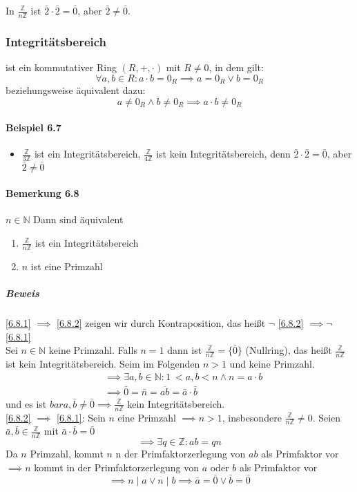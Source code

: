 \documentclass[a4paper]{scrartcl}
\DeclareMathOperator{\Forall}{\forall}
\theoremstyle{definition}
\theoremstyle{plain}
\theoremstyle{plain}
\theoremstyle{remark}
\theoremstyle{remark}
\theoremstyle{remark}
\theoremstyle{remark}
\theoremstyle{remark}
\begin{document}
In $\frac{\mathbb{Z}}{n\mathbb{Z}}$ ist $\bar 2 \cdot \bar 2 = \bar 0$, aber $\bar 2\neq \bar 0$.
\subsubsection{Integritätsbereich}
\label{sec-3-2-5}
\label{Definition-6.6}
ist ein kommutativer Ring $(R,+,\cdot)$ mit $R\neq 0$, in dem gilt:
\[\Forall a,b\in R: a\cdot b = 0_R \implies a = 0_R\vee b = 0_R\]
beziehungsweise äquivalent dazu:
\[a\neq 0_R \wedge b\neq 0_R \implies a\cdot b \neq 0_R\]
\paragraph{Beispiel 6.7}
\label{sec-3-2-5-1}
\begin{itemize}
\item $\frac{\mathbb{Z}}{3\mathbb{Z}}$ ist ein Integritätsbereich, $\frac{\mathbb{Z}}{4\mathbb{Z}}$ ist kein Integritätsbereich, denn $\bar 2\cdot \bar 2 = \bar 0$, aber $\bar 2 \neq \bar 0$
\end{itemize}
\paragraph{Bemerkung 6.8}
\label{sec-3-2-5-2}
$n\in\mathbb{N}$ Dann sind äquivalent
\begin{enumerate}
\item \label{6.8.1} $\frac{\mathbb{Z}}{n\mathbb{Z}}$ ist ein Integritätsbereich
\item \label{6.8.2} $n$ ist eine Primzahl
\end{enumerate}
\subparagraph{Beweis}
\label{sec-3-2-5-2-1}
\ref{6.8.1} $\implies$ \ref{6.8.2} zeigen wir durch Kontraposition, das heißt $\neg$ \ref{6.8.2} $\implies \neg$ \ref{6.8.1} \\
          Sei $n\in\mathbb{N}$ keine Primzahl. Falls $n = 1$ dann ist $\frac{\mathbb{Z}}{n\mathbb{Z}} = \{\bar 0\}$ (Nullring), das heißt $\frac{\mathbb{Z}}{n\mathbb{Z}}$ ist kein Integritätsbereich. Seim im Folgenden $n > 1$ und keine Primzahl.
\begin{align}
&\implies \exists a,b\in\mathbb{N}:1\ <a,b<n \wedge n = a\cdot b \\
&\implies \bar 0 = \bar n = \overline{a b} = \bar a \cdot \bar b
\end{align}
und es ist $bar a,\bar b\neq \bar 0 \implies \frac{\mathbb{Z}}{n\mathbb{Z}}$ kein Integritätsbereich. \\
          \ref{6.8.2} $\implies$ \ref{6.8.1}: Sein $n$ eine Primzahl $\implies n > 1$, insbesondere $\frac{\mathbb{Z}}{n\mathbb{Z}} \neq 0$. Seien $\bar a, \bar b \in \frac{\mathbb{Z}}{n\mathbb{Z}}$ mit $\bar a\cdot \bar b = \bar 0$
\[\implies \exists q\in\mathbb{Z}:a b = q n\]
Da $n$ Primzahl, kommt $n$ n der Primfaktorzerlegung von $a b$ als Primfaktor vor \\
          $\implies n$ kommt in der Primfaktorzerlegung von $a$ oder $b$ als Primfaktor vor \[\implies n\mid a \vee n\mid b \implies \bar a = \bar 0 \vee \bar b = \bar 0\]
\end{document}
